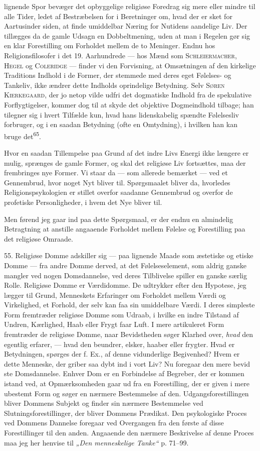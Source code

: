 \documentclass[12pt,a4paper,openany]{book}
\newcommand{\opage}[1]{\marginnote{\footnotesize\textit{[#1]}}}
\begin{document}
lignende Spor bevæger det opbyggelige religiøse Foredrag sig mere eller
mindre til alle Tider,
\opage{122}ledet af Bestræbelsen for i Beretninger om, hvad der er sket
for Aartusinder siden, at finde umiddelbar Næring for Nutidens aandelige
Liv. Der tillægges da de gamle Udsagn en Dobbeltmening, uden at man i
Regelen gør sig en klar Forestilling om Forholdet mellem de to Meninger.
Endnu hos Religionsfilosofer i det 19. Aarhundrede --- hos Mænd som
\textsc{Schleiermacher, Hegel} og \textsc{Coleridge} --- finder vi den
Forvisning, at Omsætningen af den kirkelige Traditions Indhold i de
Former, der stemmede med deres eget Følelses- og Tankeliv, ikke ændrer
dette Indholds oprindelige Betydning. Selv \textsc{Søren Kierkegaard},
der jo netop vilde udfri det dogmatiske Indhold fra de spekulative
Forflygtigelser, kommer dog til at skyde det objektive Dogmeindhold
tilbage; han tilegner sig i hvert Tilfælde kun, hvad hans lidenskabelig
spændte Følelsesliv forbruger, og i en saadan Betydning (ofte en
Omtydning), i hvilken han kan bruge det\textsuperscript{65}.

Hvor en saadan Tillempelse paa Grund af det indre Livs Energi ikke
længere er mulig, sprænges de gamle Former, og skal det religiøse Liv
fortsættes, maa der frembringes nye Former. Vi staar da --- som allerede
bemærket --- ved et Gennembrud, hvor noget Nyt bliver til. Spørgsmaalet
bliver da, hvorledes Religionspsykologien er stillet overfor saadanne
Gennembrud og overfor de profetiske Personligheder, i hvem det Nye
bliver til.

Men førend jeg gaar ind paa dette Spørgsmaal, er der endnu en almindelig
Betragtning at anstille angaaende Forholdet mellem Følelse og
Forestilling paa det religiøse Omraade.

55. Religiøse Domme adskiller sig --- paa lignende Maade som æstetiske
og etiske Domme --- fra andre Domme derved, at det Følelseselement, som
aldrig ganske mangler ved nogen Domsdannelse, ved deres Tilblivelse
spiller en ganske særlig Rolle. Religiøse Domme er Værdidomme. De
udtrykker efter den Hypotese, jeg lægger til Grund, Menneskets
Erfaringer om Forholdet mellem Værdi og Virkelighed, et Forhold, der
selv kan faa sin umiddelbare Værdi. I deres simpleste Form fremtræder
religiøse Domme som Udraab, i hvilke en indre Tilstand af Undren,
Kærlighed, Haab eller Frygt faar Luft. I mere artikuleret Form
fremtræder de religiøse Domme, naar Bevidstheden søger Klarhed over,
\textit{hvad} den egentlig erfarer, --- hvad den beundrer, elsker,
haaber eller frygter. Hvad er Betydningen, spørges der f. Ex., af denne
vidunderlige Begivenhed? Hvem er dette Menneske, der griber saa dybt ind
i vort Liv? Nu foregaar den mere bevid%
\opage{123}ste Domsdannelse. Enhver Dom er en Forbindelse af Begreber,
der er kommen istand ved, at Opmærksomheden gaar ud fra en Forestilling,
der er given i mere ubestemt Form og søger en nærmere Bestemmelse af
den. Udgangsforestillingen bliver Dommens Subjekt og finder sin nærmere
Bestemmelse ved Slutningsforestillinger, der bliver Dommens Prædikat.
Den psykologiske Proces ved Dommens Dannelse foregaar ved Overgangen fra
den første af disse Forestillinger til den anden. Angaaende den nærmere
Beskrivelse af denne Proces maa jeg her henvise til \textit{„Den
menneskelige Tanke“} p. 71--99.
\end{document}
